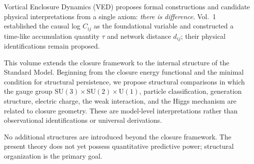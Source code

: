 Vortical Enclosure Dynamics (VED) proposes formal constructions and candidate
physical interpretations from a single axiom:
\emph{there is difference}.
Vol.~1 established the causal log $C_{ij}$ as the foundational variable and
constructed a time-like accumulation quantity $\tau$ and network distance
$d_{ij}$; their physical identifications remain proposed.

This volume extends the closure framework to the internal structure of the Standard Model.
Beginning from the closure energy functional and the minimal condition
for structural persistence, we propose structural comparisons in which the gauge group
$\mathrm{SU}(3)\times\mathrm{SU}(2)\times\mathrm{U}(1)$,
particle classification, generation structure, electric charge,
the weak interaction, and the Higgs mechanism
are related to closure geometry. These are model-level interpretations rather
than observational identifications or universal derivations.

No additional structures are introduced beyond the closure framework.
The present theory does not yet possess quantitative predictive power;
structural organization is the primary goal.
